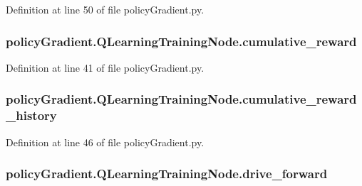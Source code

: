 Definition at line 50 of file policy\+Gradient.\+py.

\subsubsection[{\texorpdfstring{cumulative\+\_\+reward}{cumulative_reward}}]{\setlength{\rightskip}{0pt plus 5cm}policy\+Gradient.\+Q\+Learning\+Training\+Node.\+cumulative\+\_\+reward}\hypertarget{classpolicy_gradient_1_1_q_learning_training_node_a73f0820c0b97bd68bfea0c189f646c05}{}\label{classpolicy_gradient_1_1_q_learning_training_node_a73f0820c0b97bd68bfea0c189f646c05}


Definition at line 41 of file policy\+Gradient.\+py.

\subsubsection[{\texorpdfstring{cumulative\+\_\+reward\+\_\+history}{cumulative_reward_history}}]{\setlength{\rightskip}{0pt plus 5cm}policy\+Gradient.\+Q\+Learning\+Training\+Node.\+cumulative\+\_\+reward\+\_\+history}\hypertarget{classpolicy_gradient_1_1_q_learning_training_node_a46a61c05fb130f011f35fbad64a25c8b}{}\label{classpolicy_gradient_1_1_q_learning_training_node_a46a61c05fb130f011f35fbad64a25c8b}


Definition at line 46 of file policy\+Gradient.\+py.

\subsubsection[{\texorpdfstring{drive\+\_\+forward}{drive_forward}}]{\setlength{\rightskip}{0pt plus 5cm}policy\+Gradient.\+Q\+Learning\+Training\+Node.\+drive\+\_\+forward}\hypertarget{classpolicy_gradient_1_1_q_learning_training_node_a279bc7709a35a2c84e72f653cec49928}{}\label{classpolicy_gradient_1_1_q_learning_training_node_a279bc7709a35a2c84e72f653cec49928}


